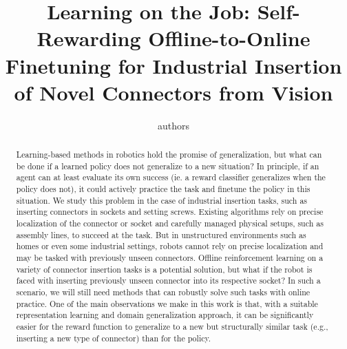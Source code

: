 \documentclass[letterpaper, 10 pt, conference, final]{ieeeconf}   %
\title{\LARGE \bf Learning on the Job: Self-Rewarding Offline-to-Online Finetuning for Industrial Insertion of Novel Connectors from Vision}
\author{authors}
\newcommand\blfootnote[1]{%
  \begingroup
  \renewcommand\thefootnote{}\footnote{#1}%
  \addtocounter{footnote}{-1}%
  \endgroup
}
\begin{document}




\vspace{-10pt}
\maketitle


\begin{abstract}
Learning-based methods in robotics hold the promise of generalization, but what can be done if a learned policy does not generalize to a new situation?
In principle, if an agent can at least evaluate its own success (ie. a reward classifier generalizes when the policy does not), it could actively practice the task and finetune the policy in this situation.
We study this problem in the case of industrial insertion tasks, such as inserting connectors in sockets and setting screws.
Existing algorithms rely on precise localization of the connector or socket and carefully managed physical setups, such as assembly lines, to succeed at the task.
But in unstructured environments such as homes or even some industrial settings, robots cannot rely on precise localization and may be tasked with previously unseen connectors. 
Offline reinforcement learning on a variety of connector insertion tasks is a potential solution, but what if the robot is faced with inserting previously unseen connector into its respective socket?
In such a scenario, we will still need methods that can robustly solve such tasks with online practice.
One of the main observations we make in this work is that, with a suitable representation learning and domain generalization approach, it can be significantly easier for the reward function to generalize to a new but structurally similar task (e.g., inserting a new type of connector) than for the policy.

\end{abstract}
\end{document}

